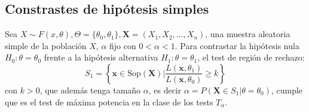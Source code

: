 \subsection{Constrastes de hipótesis simples}
\begin{tcolorbox}[colback=blue!5!white, colframe=blue!75!black, title=\textbf{Lema de Neyman-Pearson}]
Sea $X\sim F(x,\theta),\Theta=\{\theta_0,\theta_1\},\mathbf{X}=(X_1,X_2,\dots,X_n) $, una muestra aleatoria simple de la población $X$,  $\alpha$ fijo con $0<\alpha<1$. Para contrastar la hipótesis nula $H_0:\theta=\theta_0$ frente a la hipótesis alternativa $H_1:\theta=\theta_1$, el test de región de rechazo: \[
S_1=\left\{ \mathbf{x}\in \mathrm{Sop}(\mathbf{X})\bigg|\dfrac{L(\mathbf{x},\theta_1)}{L(\mathbf{x},\theta_0)}\ge k \right\} 
\] con $k>0$, que además tenga tamaño  $\alpha$, es decir $\alpha=P(\mathbf{X}\in S_1|\theta=\theta_0)$, cumple que es el test de máxima potencia en la clase de los tests $T_\alpha$.
\end{tcolorbox}

